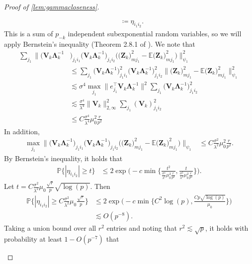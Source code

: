 \documentclass[10pt]{article}
\newcommand{\0}{{\mathbf{0}}}
\newcommand{\1}{{\mathbf{1}}}
\newcommand{\E}{{\mathbf{E}}}
\renewcommand{\citet}{\cite}
\renewcommand{\t}{^{\top}}
\newcommand{\p}{\mathbb{P}}
\newcommand{\inv}{^{-1}}
\renewcommand{\E}{\mathbb{E}}
\begin{document}
\begin{proof}[Proof of \cref{lem:gammacloseness}]
\begin{itemize}
\begin{align*}
    &\coloneqq \eta_{i_1i_2}.
\end{align*}
This is a sum of $p_{-k}$ independent subexponential random variables, so we will apply Bernstein's inequality (Theorem 2.8.1 of \citet{vershynin_high-dimensional_2018}).  We note that
\begin{align*}
    \sum_{j_1} \bigg\| \big( \mathbf{V}_k \mathbf{\Lambda}_k\inv &\big)_{j_1 i_1} \big( \mathbf{V}_k \mathbf{\Lambda}_k\inv\big)_{j_1 i_2} \bigg(\big( \mathbf{Z}_k\big)_{mj_1}^2 - \E \big( \mathbf{Z}_k\big)_{mj_1}^2 \bigg) \bigg\|_{\psi_1}^2 \\
    &\leq \sum_{j_1} \big( \mathbf{V}_k \mathbf{\Lambda}_k\inv \big)_{j_1 i_1}^2 \big( \mathbf{V}_k \mathbf{\Lambda}_k\inv\big)_{j_1 i_2}^2 \|  \big( \mathbf{Z}_k\big)_{mj_1}^2 - \E \big( \mathbf{Z}_k\big)_{mj_1}^2 \|_{\psi_1}^2 \\
    &\lesssim\sigma^4 \max_{j_1} \| e_{j_1}\t\mathbf{V}_k \mathbf{\Lambda}_k\inv \|^2 \sum_{j_1} \big( \mathbf{V}_k \mathbf{\Lambda}_k\inv\big)_{j_1 i_2}^2  \\
    &\lesssim \frac{\sigma^4}{\lambda^4} \| \mathbf{V}_k \|_{2,\infty}^2 \sum_{j_1} (\mathbf{V}_k)_{j_1 i_2}^2 \\
    &\leq C\frac{\sigma^4}{\lambda^4} \mu_0^2 \frac{r}{p^2}
\end{align*}
In addition,
\begin{align*}
    \max_{j_1} \bigg\| \big( \mathbf{V}_k \mathbf{\Lambda}_k\inv \big)_{j_1 i_1} \big( \mathbf{V}_k \mathbf{\Lambda}_k\inv\big)_{j_1 i_2} \bigg(\big( \mathbf{Z}_k\big)_{mj_1}^2 - \E \big( \mathbf{Z}_k\big)_{mj_1}^2 \bigg) \bigg\|_{\psi_1} &\leq C \frac{\sigma^2}{\lambda^2} \mu_0^2 \frac{r}{p^2}.
\end{align*}
By Bernstein's inequality, it holds that
\begin{align*}
    \p\bigg\{ |\eta_{i_1i_2} | \geq t \bigg\} &\leq 2 \exp\bigg( -c \min\bigg\{ \frac{t^2}{ \frac{\sigma^4}{\lambda^4} \mu_0^2 \frac{r}{p^2}}, \frac{t}{\frac{\sigma^2}{\lambda^2} \mu_0^2 \frac{r}{p^2}} \bigg\} \bigg).
\end{align*}
Let $t = C\frac{\sigma^2}{\lambda^2} \mu_0 \frac{\sqrt{r}}{p} \sqrt{\log(p)}$.  Then 
\begin{align*}
      \p\bigg\{ |\eta_{i_1i_2} | \geq C \frac{\sigma^2}{\lambda^2} \mu_0 \frac{\sqrt{r}}{p} \bigg\} &\leq 2 \exp\bigg( -c \min\bigg\{ C^2 \log(p), \frac{C p \sqrt{\log(p)}}{\mu_0} \bigg\} \bigg) \\
      &\lesssim O(p^{-8}).
\end{align*}
Taking a union bound over all $r^2$ entries and noting that $r^2 \lesssim \sqrt{p}$, it holds with probability at least $1 - O(p^{-7})$ that

\end{itemize}
\end{proof}
\end{document}
